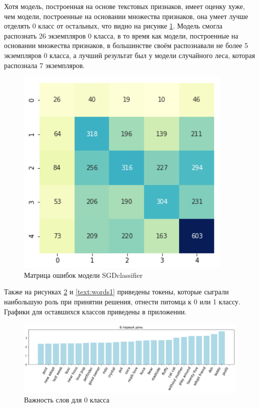 \documentclass[14pt]{mmcs_article}
\begin{document}
Хотя модель, построенная на основе текстовых признаков, имеет оценку хуже, чем модели, построенные на основании множества признаков, она умеет лучше отделять 0 класс от остальных, что видно на рисунке \ref{text:confusion}. Модель смогла распознать 26 экземпляров 0 класса, в то время как модели, построенные на основании множества признаков, в большинстве своём распознавали не более 5 экземпляров 0 класса, а лучший результат был у модели случайного леса, которая распознала 7 экземпляров.

\begin{figure}[H]
	\centering
	\includegraphics[scale=0.8]{confusionmatrix.png}
	\caption{Матрица ошибок модели SGDclassifier}\label{text:confusion}
\end{figure}

Также на рисунках \ref{text:words0} и \ref{text:words1} приведены токены, которые сыграли наибольшую роль при принятии решения, отнести питомца к 0 или 1 классу. Графики для оставшихся классов приведены в приложении.

\begin{figure}[H]
	\centering
	\includegraphics[scale=0.55]{words0.png}
	\caption{Важность слов для 0 класса}\label{text:words0}
\end{figure}
\end{document}
